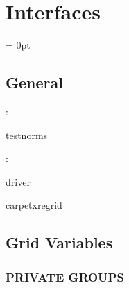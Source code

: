 
\section{Interfaces} 


\parskip = 0pt

\vspace{3mm} \subsection*{General}

: 

testnorms
\vspace{2mm}

: 

driver

carpetxregrid
\vspace{2mm}
\subsection*{Grid Variables}
\vspace{5mm}\subsubsection{PRIVATE GROUPS}

\vspace{5mm}

